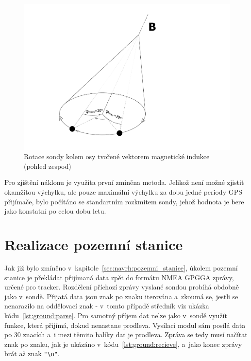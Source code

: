 \documentclass[twoside]{ctuthesis}
\theoremstyle{plain}
\theoremstyle{definition}
\theoremstyle{note}
\begin{document}
		\begin{figure}[hbtp]
			\centering
			\includegraphics[width=.5\textwidth]{Figures/sonda_naklon_mag_osova_rotace.pdf}
			\caption{Rotace sondy kolem osy tvořené vektorem magnetické indukce (pohled zespod)}
			\label{fig:sonda:mag:rot}
		\end{figure}

		Pro zjištění náklonu je využita první zmíněna metoda. Jelikož není možné zjistit okamžitou výchylku, ale pouze maximální výchylku za dobu jedné periody GPS přijímače, bylo počítáno se standartním rozkmitem sondy, jehož hodnota je bere jako konstatní po celou dobu letu. 
		


	












	
	\section{Realizace pozemní stanice}

	Jak již bylo zmíněno v~kapitole~\ref{sec:navrh:pozemni_stanice}, úkolem pozemní stanice je překládat přijímaná data zpět do formátu NMEA GPGGA zprávy, určené pro tracker. Rozdělení příchozí zprávy vyslané sondou probíhá obdobně jako v~sondě. Přijatá data jsou znak po znaku iterována a~zkoumá se, jestli se nenarazilo na oddělovací znak - v~tomto případě středník viz ukázka kódu~\ref{lst:ground:parse}. Pro samotný příjem dat nelze jako v~sondě využít funkce, která přijímá, dokud nenastane prodleva. Vysílací modul sám posílá data po 30 znacích a~i mezi těmito balíky dat je prodleva. Zpráva se tedy musí načítat znak po znaku, jak je ukázáno v~kódu~\ref{lst:ground:recieve}, a~jako konec zprávy brát až znak \lstinline |"\n"|.
\end{document}
